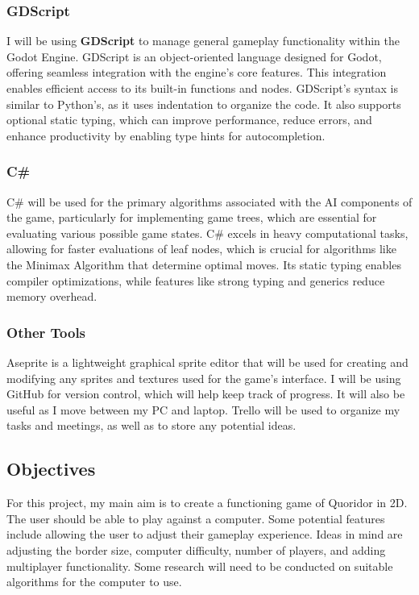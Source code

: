 \documentclass[review]{cmpreport}
\begin{document}
\subsubsection{GDScript}
I will be using \textbf{GDScript} to manage general gameplay functionality within the Godot Engine. GDScript is an object-oriented language designed for Godot, offering seamless integration with the engine's core features. This integration enables efficient access to its built-in functions and nodes. GDScript's syntax is similar to Python's, as it uses indentation to organize the code. It also supports optional static typing, which can improve performance, reduce errors, and enhance productivity by enabling type hints for autocompletion.

\subsubsection{C\#}
C\# will be used for the primary algorithms associated with the AI components of the game, particularly for implementing game trees, which are essential for evaluating various possible game states. C\# excels in heavy computational tasks, allowing for faster evaluations of leaf nodes, which is crucial for algorithms like the Minimax Algorithm that determine optimal moves. Its static typing enables compiler optimizations, while features like strong typing and generics reduce memory overhead.

\subsubsection{Other Tools}
Aseprite is a lightweight graphical sprite editor that will be used for creating and modifying any sprites and textures used for the game's interface. I will be using GitHub for version control, which will help keep track of progress. It will also be useful as I move between my PC and laptop. Trello will be used to organize my tasks and meetings, as well as to store any potential ideas.

\subsection{Objectives}
For this project, my main aim is to create a functioning game of Quoridor in 2D. The user should be able to play against a computer. Some potential features include allowing the user to adjust their gameplay experience. Ideas in mind are adjusting the border size, computer difficulty, number of players, and adding multiplayer functionality. Some research will need to be conducted on suitable algorithms for the computer to use.
\newline
\end{document}
